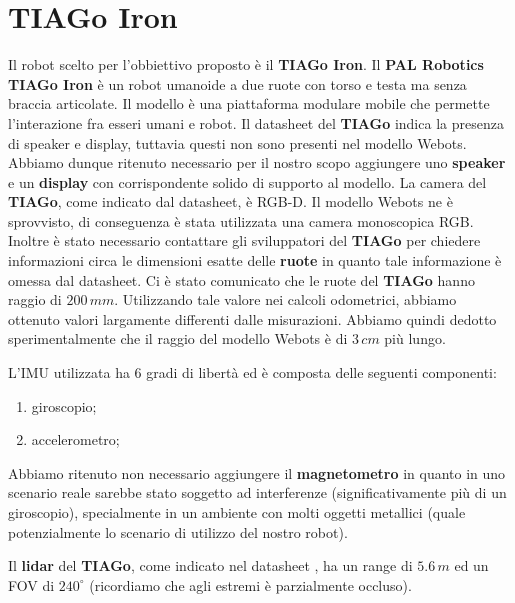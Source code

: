 \documentclass[a4paper]{article}
\begin{document}
	\section{TIAGo Iron}\label{sec:TIAGo-Iron} 
	Il robot scelto per l'obbiettivo proposto è il \textbf{TIAGo Iron}. \newline Il \textbf{PAL Robotics TIAGo Iron} \cite{tiagoiron} è un robot umanoide a due ruote con torso e testa ma senza braccia articolate. Il modello è una piattaforma modulare mobile che permette l'interazione fra esseri umani e robot. \newline
	Il datasheet del \textbf{TIAGo} indica la presenza di speaker e display, tuttavia questi non sono presenti nel modello Webots. Abbiamo dunque ritenuto necessario per il nostro scopo aggiungere uno \textbf{speaker} e un \textbf{display} con corrispondente solido di supporto al modello.
	La camera del \textbf{TIAGo}, come indicato dal datasheet, è RGB-D. Il modello Webots ne è sprovvisto, di conseguenza è stata utilizzata una camera monoscopica RGB.
	Inoltre è stato necessario contattare gli sviluppatori del \textbf{TIAGo} per chiedere informazioni circa le dimensioni esatte delle \textbf{ruote} in quanto tale informazione è omessa dal datasheet. Ci è stato comunicato che le ruote del \textbf{TIAGo} hanno raggio di $200\,mm$. Utilizzando tale valore nei calcoli odometrici, abbiamo ottenuto valori largamente differenti dalle misurazioni. Abbiamo quindi dedotto sperimentalmente che il raggio del modello Webots è di $3\,cm$ più lungo. 
	
    L'IMU utilizzata ha 6 gradi di libertà ed è composta delle seguenti componenti:
	\begin{enumerate}
		\item giroscopio;	
		\item accelerometro;
	\end{enumerate}
	Abbiamo ritenuto non necessario aggiungere il \textbf{magnetometro} in quanto in uno scenario reale sarebbe stato soggetto ad interferenze (significativamente più di un giroscopio), specialmente in un ambiente con molti oggetti metallici (quale potenzialmente lo scenario di utilizzo del nostro robot).
	
	Il \textbf{lidar} del \textbf{TIAGo}, come indicato nel datasheet \cite{tiago_datasheet}, ha un range di $5.6\,m$ ed un FOV di $240^{\circ}$ (ricordiamo che agli estremi è parzialmente occluso).
\end{document}
